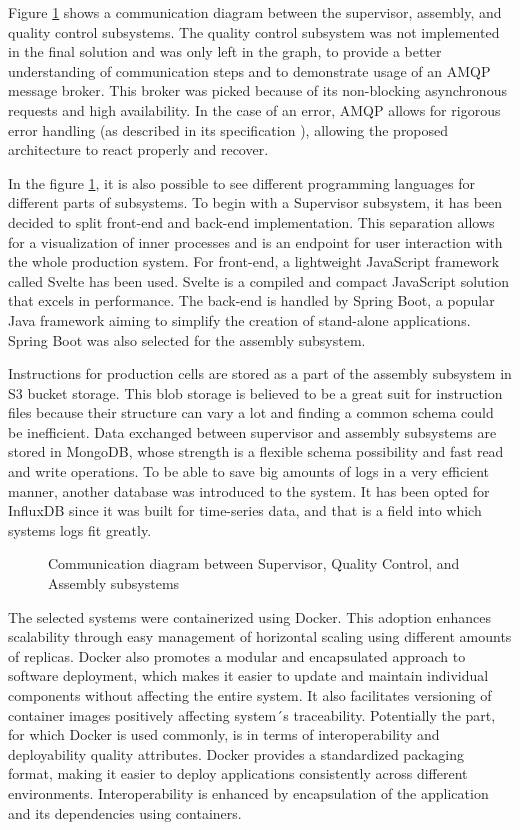 \documentclass[conference]{IEEEtran}
\begin{document}
Figure \ref{fig:communicationDiagram} shows a communication diagram between the supervisor, assembly, and quality control subsystems. The quality control subsystem was not implemented in the final solution and was only left in the graph, to provide a better understanding of communication steps and to demonstrate usage of an AMQP message broker. This broker was picked because of its non-blocking asynchronous requests and high availability. In the case of an error, AMQP allows for rigorous error handling (as described in its specification \cite{amqpDoc}), allowing the proposed architecture to react properly and recover.

In the figure \ref{fig:communicationDiagram}, it is also possible to see different programming languages for different parts of subsystems. To begin with a Supervisor subsystem, it has been decided to split front-end and back-end implementation. This separation allows for a visualization of inner processes and is an endpoint for user interaction with the whole production system. For front-end, a lightweight JavaScript framework called Svelte has been used. Svelte is a compiled and compact JavaScript solution that excels in performance. The back-end is handled by Spring Boot, a popular Java framework aiming to simplify the creation of stand-alone applications. Spring Boot was also selected for the assembly subsystem. 

Instructions for production cells are stored as a part of the assembly subsystem in S3 bucket storage. This blob storage is believed to be a great suit for instruction files because their structure can vary a lot and finding a common schema could be inefficient. Data exchanged between supervisor and assembly subsystems are stored in MongoDB, whose strength is a flexible schema possibility and fast read and write operations. To be able to save big amounts of logs in a very efficient manner, another database was introduced to the system. It has been opted for InfluxDB since it was built for time-series data, and that is a field into which systems logs fit greatly.

\begin{figure}
 \centering
 
 \caption{Communication diagram between Supervisor, Quality Control, and Assembly subsystems}
 \label{fig:communicationDiagram}
\end{figure}

The selected systems were containerized using Docker. This adoption enhances scalability through easy management of horizontal scaling using different amounts of replicas. Docker also promotes a modular and encapsulated approach to software deployment, which makes it easier to update and maintain individual components without affecting the entire system. It also facilitates versioning of container images positively affecting system´s traceability. Potentially the part, for which Docker is used commonly, is in terms of interoperability and deployability quality attributes. Docker provides a standardized packaging format, making it easier to deploy applications consistently across different environments. Interoperability is enhanced by encapsulation of the application and its dependencies using containers.
\end{document}

